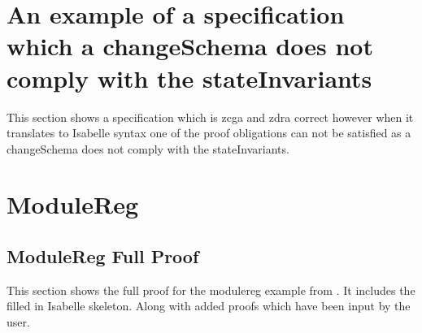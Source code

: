 \section{An example of a specification which a changeSchema
does not comply with the stateInvariants}
This section shows a specification which is \gls{zcga} and \gls{zdra} correct however when it translates to Isabelle syntax one of the proof obligations can not be satisfied as a changeSchema does  not comply with the stateInvariants.

%
%
%
%

\section{ModuleReg}
\label{app:moduleregfullproof}

\subsection{ModuleReg Full Proof}

This section shows the full proof for the modulereg example from \cite{essenceofz}. It includes the filled in Isabelle skeleton. Along with added proofs which have been input by the user.





